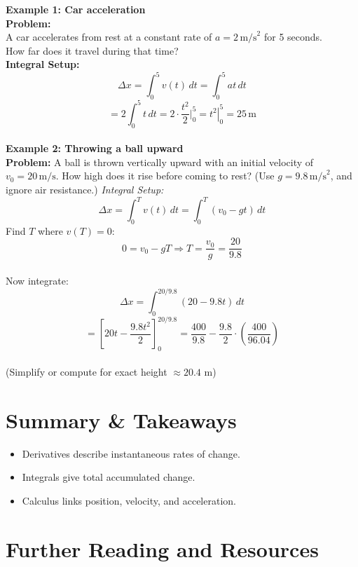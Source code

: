 \documentclass[12pt,a4paper]{article}
\begin{document}
\textbf{Example 1: Car acceleration} \\
\textbf{Problem:}\\
A car accelerates from rest at a constant rate of $a = 2 \, \text{m/s}^2$ for 5 seconds.\\
How far does it travel during that time?\\
\textbf{Integral Setup:}\\
\[
\Delta x = \int_0^5 v(t) \, dt = \int_0^5 at \, dt
\]
\[
= 2 \int_0^5 t \, dt = 2 \cdot \frac{t^2}{2} \bigg|_0^5 = \left. t^2 \right|_0^5 = 25 \, \text{m}
\]\\
\textbf{Example 2: Throwing a ball upward} \\
\textbf{Problem:}
A ball is thrown vertically upward with an initial velocity of $v_0 = 20 \, \text{m/s}$.
How high does it rise before coming to rest?
(Use $g = 9.8 \, \text{m/s}^2$, and ignore air resistance.)
\textit{Integral Setup:}
\[
\Delta x = \int_0^T v(t) \, dt = \int_0^T (v_0 - g t) \, dt
\]
Find $T$ where $v(T) = 0$:\\
\[
0 = v_0 - gT \Rightarrow T = \frac{v_0}{g} = \frac{20}{9.8}
\]\\
Now integrate:
\[
\Delta x = \int_0^{20/9.8} (20 - 9.8t) \, dt\]
\[= \left[ 20t - \frac{9.8t^2}{2} \right]_0^{20/9.8} = \frac{400}{9.8} - \frac{9.8}{2} \cdot \left(\frac{400}{96.04} \right)\]\\
(Simplify or compute for exact height $\approx 20.4$ m)




\section*{Summary \& Takeaways}

\begin{itemize}
    \item Derivatives describe instantaneous rates of change.
    \item Integrals give total accumulated change.
    \item Calculus links position, velocity, and acceleration.
    
\end{itemize}
\newpage

\section*{Further Reading and Resources}
\end{document}
